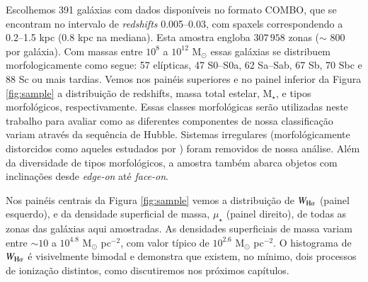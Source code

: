 Escolhemos 391 galáxias com dados disponíveis no formato COMBO, que se encontram no intervalo de {\em redshifts}  0.005--0.03, com spaxels correspondendo a 0.2--1.5 kpc (0.8 kpc na mediana). Esta amostra engloba $307\,958$ zonas ($\sim$ 800 por galáxia). Com massas entre $10^8$ a $10^{12}$ M$_\odot$ essas galáxias se distribuem morfologicamente como segue: 57 elípticas, 47 S0--S0a, 62 Sa--Sab, 67 Sb, 70 Sbc e 88 Sc ou mais tardias. Vemos nos painéis superiores e no painel inferior da Figura \ref{fig:sample} a distribuição de {\rm redshifts}, massa total estelar, M$_\star$, e tipos morfológicos, respectivamente. Essas classes morfológicas serão utilizadas neste trabalho para avaliar como as diferentes componentes de nossa classificação variam através da sequência de Hubble. Sistemas irregulares (morfológicamente distorcidos como aqueles estudados por \citealt{Wild.etal.2014, BB.etal.2015b, BB.etal.2015a, CortijoFerrero.etal.2017a, CortijoFerrero.etal.2017b}) foram removidos de nossa análise. Além da diversidade de tipos morfológicos, a amostra também abarca objetos com inclinações desde {\em edge-on} até {\em face-on}.

Nos painéis centrais da Figura \ref{fig:sample} vemos a distribuição de $W_{\Ha}$ (painel esquerdo), e da densidade superficial de massa, $\mu_\star$ (painel direito), de todas as zonas das galáxias aqui amostradas. As densidades superficiais de massa variam entre $\sim 10$ a $10^{4.8}$ M$_\odot$ pc$^{-2}$, com valor típico de $10^{2.6}$ M$_\odot$ pc$^{-2}$. O histograma de $W_{\Ha}$ é visivelmente bimodal e demonstra que existem, no mínimo, dois processos de ionização distintos, como discutiremos nos próximos capítulos.


